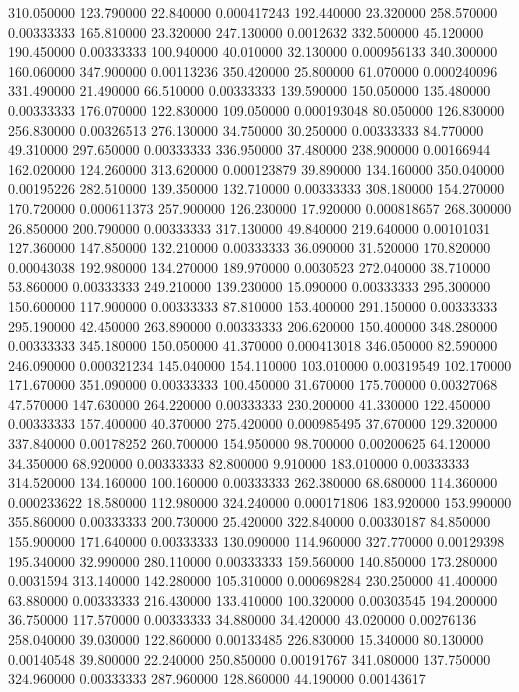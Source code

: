 310.050000	123.790000	22.840000	0.000417243
192.440000	23.320000	258.570000	0.00333333
165.810000	23.320000	247.130000	0.0012632
332.500000	45.120000	190.450000	0.00333333
100.940000	40.010000	32.130000	0.000956133
340.300000	160.060000	347.900000	0.00113236
350.420000	25.800000	61.070000	0.000240096
331.490000	21.490000	66.510000	0.00333333
139.590000	150.050000	135.480000	0.00333333
176.070000	122.830000	109.050000	0.000193048
80.050000	126.830000	256.830000	0.00326513
276.130000	34.750000	30.250000	0.00333333
84.770000	49.310000	297.650000	0.00333333
336.950000	37.480000	238.900000	0.00166944
162.020000	124.260000	313.620000	0.000123879
39.890000	134.160000	350.040000	0.00195226
282.510000	139.350000	132.710000	0.00333333
308.180000	154.270000	170.720000	0.000611373
257.900000	126.230000	17.920000	0.000818657
268.300000	26.850000	200.790000	0.00333333
317.130000	49.840000	219.640000	0.00101031
127.360000	147.850000	132.210000	0.00333333
36.090000	31.520000	170.820000	0.00043038
192.980000	134.270000	189.970000	0.0030523
272.040000	38.710000	53.860000	0.00333333
249.210000	139.230000	15.090000	0.00333333
295.300000	150.600000	117.900000	0.00333333
87.810000	153.400000	291.150000	0.00333333
295.190000	42.450000	263.890000	0.00333333
206.620000	150.400000	348.280000	0.00333333
345.180000	150.050000	41.370000	0.000413018
346.050000	82.590000	246.090000	0.000321234
145.040000	154.110000	103.010000	0.00319549
102.170000	171.670000	351.090000	0.00333333
100.450000	31.670000	175.700000	0.00327068
47.570000	147.630000	264.220000	0.00333333
230.200000	41.330000	122.450000	0.00333333
157.400000	40.370000	275.420000	0.000985495
37.670000	129.320000	337.840000	0.00178252
260.700000	154.950000	98.700000	0.00200625
64.120000	34.350000	68.920000	0.00333333
82.800000	9.910000	183.010000	0.00333333
314.520000	134.160000	100.160000	0.00333333
262.380000	68.680000	114.360000	0.000233622
18.580000	112.980000	324.240000	0.000171806
183.920000	153.990000	355.860000	0.00333333
200.730000	25.420000	322.840000	0.00330187
84.850000	155.900000	171.640000	0.00333333
130.090000	114.960000	327.770000	0.00129398
195.340000	32.990000	280.110000	0.00333333
159.560000	140.850000	173.280000	0.0031594
313.140000	142.280000	105.310000	0.000698284
230.250000	41.400000	63.880000	0.00333333
216.430000	133.410000	100.320000	0.00303545
194.200000	36.750000	117.570000	0.00333333
34.880000	34.420000	43.020000	0.00276136
258.040000	39.030000	122.860000	0.00133485
226.830000	15.340000	80.130000	0.00140548
39.800000	22.240000	250.850000	0.00191767
341.080000	137.750000	324.960000	0.00333333
287.960000	128.860000	44.190000	0.00143617
